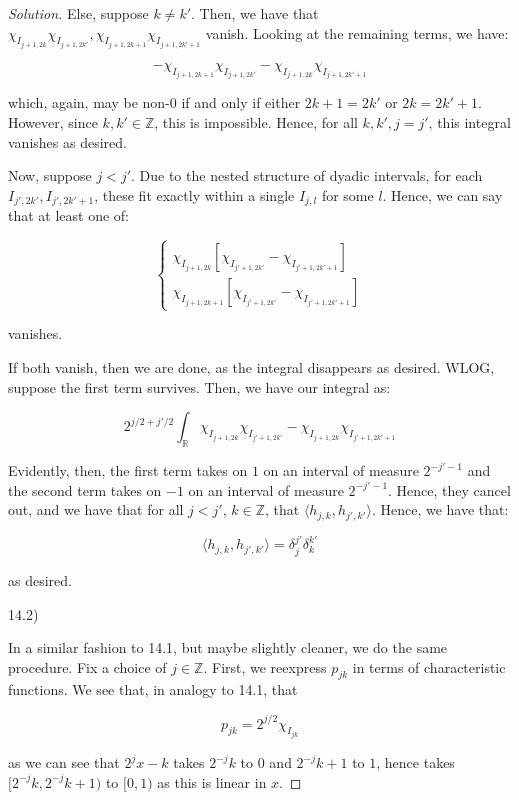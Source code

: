 \documentclass[10pt]{article}
\begin{document}
\begin{proof}[Solution]
Else, suppose $k \not = k'$. Then, we have that $\chi_{I_{j+1, 2k}}\chi_{I_{j+1, 2k'}},   \chi_{I_{j+1, 2k+1}} \chi_{I_{j+1, 2k'+1}}$ vanish. Looking at the remaining terms, we have:

$$  - \chi_{I_{j+1, 2k+1}}\chi_{I_{j+1, 2k'}} - \chi_{I_{j+1, 2k}}\chi_{I_{j+1, 2k'+1}} $$

which, again, may be non-0 if and only if either $2k + 1 = 2k'$ or $2k = 2k' + 1$. However, since $k, k' \in \mathbb{Z}$, this is impossible. Hence, for all $k, k', j = j'$, this integral vanishes as desired.

Now, suppose $j < j'$. Due to the nested structure of dyadic intervals, for each $I_{j',2k'}, I_{j', 2k'+1}$, these fit exactly within a single $I_{j, l}$ for some $l$. Hence, we can say that at least one of:

$$ \begin{cases} \chi_{I_{j+1, 2k}}[\chi_{I_{j'+1, 2k'}} - \chi_{I_{j'+1, 2k'+1}}] \\ \chi_{I_{j+1, 2k+1}} [\chi_{I_{j'+1, 2k'}} - \chi_{I_{j'+1, 2k'+1}}] \end{cases}$$

vanishes.

If both vanish, then we are done, as the integral disappears as desired. WLOG, suppose the first term survives. Then, we have our integral as:

$$ 2^{j/2 + j'/2} \int_{\mathbb{R}} \chi_{I_{j+1, 2k}}\chi_{I_{j'+1, 2k'}} -  \chi_{I_{j+1, 2k}}\chi_{I_{j'+1, 2k'+1}} $$

Evidently, then, the first term takes on $1$ on an interval of measure $2^{-j'-1}$ and the second term takes on $-1$ on an interval of measure $2^{-j'-1}$. Hence, they cancel out, and we have that for all $j < j'$, $k \in \mathbb{Z}$, that $ \langle h_{j,k}, h_{j', k'} \rangle$. Hence, we have that:

$$  \langle h_{j,k}, h_{j', k'} \rangle = \delta_j^{j'} \delta_k^{k'}$$

as desired.

14.2)

In a similar fashion to 14.1, but maybe slightly cleaner, we do the same procedure. Fix a choice of $j \in \mathbb{Z}$. First, we reexpress $p_{jk}$ in terms of characteristic functions. We see that, in analogy to 14.1, that

$$  p_{jk} = 2^{j/2} \chi_{I_{jk}} $$

as we can see that $2^j x - k$ takes $2^{-j}k$ to $0$ and $2^{-j} k+1$ to $1$, hence takes $[2^{-j}k, 2^{-j}k+1)$ to $[0,1)$ as this is linear in $x$. 


\end{proof}
\end{document}
